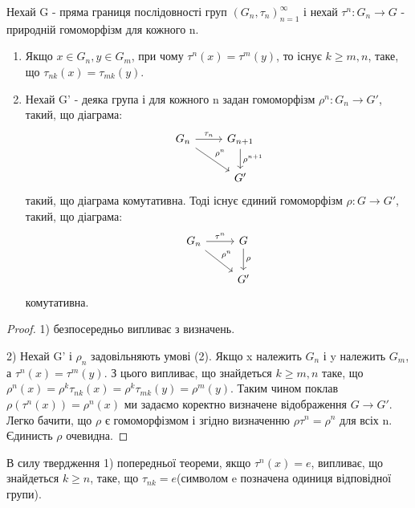 \begin{theorem}
    Нехай G - пряма границя послідовності груп $(G_n, \tau_n)_{n=1}^{\infty}$ і нехай $\tau^n: G_n \rightarrow G$ -
    природній гомоморфізм для кожного n.
    \begin{enumerate}
        \item Якщо $x \in G_n, y \in G_m$, при чому $\tau^n(x) = \tau^m(y)$, то існує $k \geq m,n$, таке, що
        $\tau_{nk}(x) = \tau_{mk}(y)$.
        \item Нехай G' - деяка група і для кожного n задан гомоморфізм $\rho^n: G_n \rightarrow G'$, такий, що
        діаграма:
        \begin{equation*}
            \begin{tikzcd}
                G_n \arrow[rd, "\rho^n"] \arrow[r, "\tau_n"] & G_{n+1} \arrow[d, "\rho^{n+1}"] \\
                & G'
            \end{tikzcd}
        \end{equation*}
        такий, що діаграма комутативна.
        Тоді існує єдиний гомоморфізм $\rho: G \rightarrow G'$, такий, що діаграма:
        \begin{equation*}
            \begin{tikzcd}
                G_n \arrow[rd, "\rho^n"] \arrow[r, "\tau^n"] & G \arrow[d, "\rho"] \\
                & G'
            \end{tikzcd}
        \end{equation*}
        комутативна.
    \end{enumerate}

    \begin{proof}
        1) безпосередньо випливає з визначень.

        2) Нехай G' і $\rho_n$ задовільняють умові (2).
        Якщо x належить $G_n$ і y належить $G_m$, а $\tau^n(x) = \tau^m(y)$.
        З цього випливає, що знайдеться $k \geq m,n$ таке, що $\rho^n(x) = \rho^k\tau_{nk}(x) = \rho^k \tau_{mk}(y) = \rho^m(y)$.
        Таким чином поклав $\rho(\tau^n(x)) = \rho^n(x)$ ми задаємо коректно визначене відображення $G \rightarrow G'$.
        Легко бачити, що $\rho$ є гомоморфізмом і згідно визначенню $\rho \tau^n = \rho^n$ для всіх n.
        Єдинисть $\rho$ очевидна.
    \end{proof}
\end{theorem}

\begin{remark}
    В силу твердження 1) попередньої теореми, якщо $\tau^n(x) = e$, випливає, що знайдеться $k \geq n$, таке, що
    $\tau_{nk} = e$(символом e позначена одиниця відповідної групи).
\end{remark}

